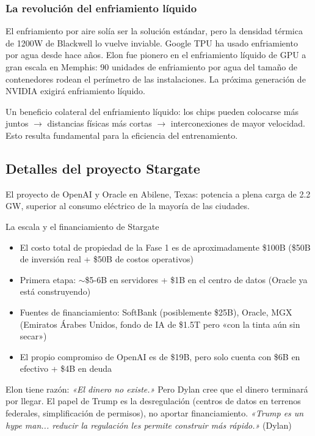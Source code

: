 \subsubsection{La revolución del enfriamiento líquido}

El enfriamiento por aire solía ser la solución estándar, pero la densidad térmica de 1200W de Blackwell lo vuelve inviable. Google TPU ha usado enfriamiento por agua desde hace años. Elon fue pionero en el enfriamiento líquido de GPU a gran escala en Memphis: 90 unidades de enfriamiento por agua del tamaño de contenedores rodean el perímetro de las instalaciones. La próxima generación de NVIDIA exigirá enfriamiento líquido.

Un beneficio colateral del enfriamiento líquido: los chips pueden colocarse más juntos $\to$ distancias físicas más cortas $\to$ interconexiones de mayor velocidad. Esto resulta fundamental para la eficiencia del entrenamiento.

\subsection{Detalles del proyecto Stargate}

El proyecto de OpenAI y Oracle en Abilene, Texas: potencia a plena carga de 2.2 GW, superior al consumo eléctrico de la mayoría de las ciudades.

\begin{importantbox}{La escala y el financiamiento de Stargate}
\begin{itemize}
    \item El costo total de propiedad de la Fase 1 es de aproximadamente \$100B (\$50B de inversión real + \$50B de costos operativos)
    \item Primera etapa: $\sim$\$5-6B en servidores + \$1B en el centro de datos (Oracle ya está construyendo)
    \item Fuentes de financiamiento: SoftBank (posiblemente \$25B), Oracle, MGX (Emiratos Árabes Unidos, fondo de IA de \$1.5T pero «con la tinta aún sin secar»)
    \item El propio compromiso de OpenAI es de \$19B, pero solo cuenta con \$6B en efectivo + \$4B en deuda
\end{itemize}

Elon tiene razón: \textit{«El dinero no existe.»} Pero Dylan cree que el dinero terminará por llegar. El papel de Trump es la desregulación (centros de datos en terrenos federales, simplificación de permisos), no aportar financiamiento. \textit{«Trump es un hype man... reducir la regulación les permite construir más rápido.»} (Dylan)
\end{importantbox}

